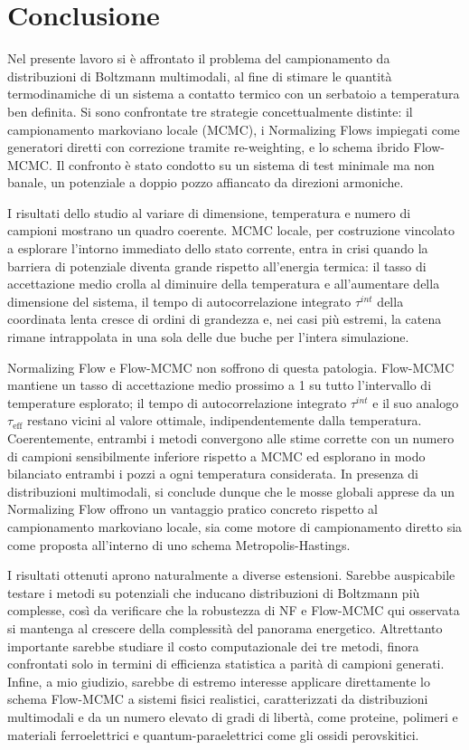\chapter*{Conclusione}

Nel presente lavoro si è affrontato il problema del campionamento da distribuzioni di Boltzmann multimodali, al fine di stimare le quantità termodinamiche di un sistema a contatto termico con un serbatoio a temperatura ben definita. Si sono confrontate tre strategie concettualmente distinte: il campionamento markoviano locale (MCMC), i Normalizing Flows impiegati come generatori diretti con correzione tramite re-weighting, e lo schema ibrido Flow-MCMC. Il confronto è stato condotto su un sistema di test minimale ma non banale, un potenziale a doppio pozzo affiancato da direzioni armoniche.

I risultati dello studio al variare di dimensione, temperatura e numero di campioni mostrano un quadro coerente. MCMC locale, per costruzione vincolato a esplorare l'intorno immediato dello stato corrente, entra in crisi quando la barriera di potenziale diventa grande rispetto all'energia termica: il tasso di accettazione medio crolla al diminuire della temperatura e all'aumentare della dimensione del sistema, il tempo di autocorrelazione integrato $\tau^{int}$ della coordinata lenta cresce di ordini di grandezza e, nei casi più estremi, la catena rimane intrappolata in una sola delle due buche per l'intera simulazione.

Normalizing Flow e Flow-MCMC non soffrono di questa patologia. Flow-MCMC mantiene un tasso di accettazione medio prossimo a 1 su tutto l'intervallo di temperature esplorato; il tempo di autocorrelazione integrato $\tau^{int}$ e il suo analogo $\tau_{\text{eff}}$ restano vicini al valore ottimale, indipendentemente dalla temperatura. Coerentemente, entrambi i metodi convergono alle stime corrette con un numero di campioni sensibilmente inferiore rispetto a MCMC ed esplorano in modo bilanciato entrambi i pozzi a ogni temperatura considerata. In presenza di distribuzioni multimodali, si conclude dunque che le mosse globali apprese da un Normalizing Flow offrono un vantaggio pratico concreto rispetto al campionamento markoviano locale, sia come motore di campionamento diretto sia come proposta all'interno di uno schema Metropolis-Hastings.

I risultati ottenuti aprono naturalmente a diverse estensioni. Sarebbe auspicabile testare i metodi su potenziali che inducano distribuzioni di Boltzmann più complesse, così da verificare che la robustezza di NF e Flow-MCMC qui osservata si mantenga al crescere della complessità del panorama energetico. Altrettanto importante sarebbe studiare il costo computazionale dei tre metodi, finora confrontati solo in termini di efficienza statistica a parità di campioni generati. Infine, a mio giudizio, sarebbe di estremo interesse applicare direttamente lo schema Flow-MCMC a sistemi fisici realistici, caratterizzati da distribuzioni multimodali e da un numero elevato di gradi di libertà, come proteine, polimeri e materiali ferroelettrici e quantum-paraelettrici come gli ossidi perovskitici.